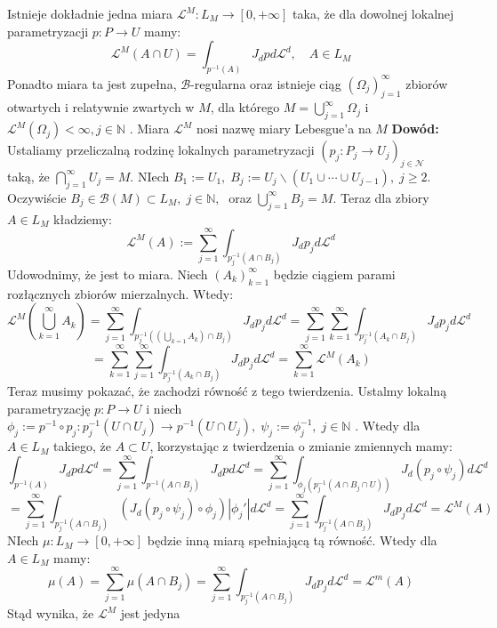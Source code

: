 \begin{tw}
	Istnieje dokładnie jedna miara $\mathcal{L}^M: L_M \rightarrow [0, +\infty]$ taka, że dla dowolnej lokalnej parametryzacji $p: P \rightarrow U$ mamy: $$
		\mathcal{L}^M(A \cap U) = \int_{p^{-1}(A)} J_dp d \mathcal{L}^d, \quad A \in L_M
	$$
	Ponadto miara ta jest zupełna, $\mathcal{B}$-regularna oraz istnieje ciąg $(\Omega_j)_{j=1}^{\infty}$ zbiorów otwartych i relatywnie zwartych w $M$, dla którego $M = \bigcup_{j=1}^{\infty} \Omega_j$ i $\mathcal{L}^M(\Omega_j) < \infty, j \in \mathbb{N}$ . Miara $\mathcal{L}^M$ nosi nazwę miary Lebesgue'a na $M$ 
	\newline
	\textbf{Dowód:}\newline
	Ustaliamy przeliczalną rodzinę lokalnych parametryzacji $(p_j: P_j \rightarrow U_j)_{j \in \mathcal{N}}$ taką, że $\bigcap_{j=1}^{\infty} U_j = M$. NIech $B_1:= U_1, \; B_j := U_j \backslash (U_1 \cup \cdots \cup U_{j-1}), \; j \geq 2$. Oczywiście $B_j \in \mathcal{B}(M) \subset L_M, \; j \in \mathbb{N},\;$ oraz $\bigcup_{j=1}^{\infty} B_j = M$. Teraz dla zbiory $A \in L_M$ kładziemy: $$
		\mathcal{L}^M(A) := \sum_{j=1}^{\infty} \int_{p_j^{-1}(A \cap B_j)} J_dp_j d\mathcal{L}^d
	$$
	Udowodnimy, że jest to miara. Niech $(A_k)_{k=1}^{\infty}$ będzie ciągiem parami rozłącznych zbiorów mierzalnych. Wtedy: 
	$$
		\mathcal{L}^M(\bigcup_{k=1}^{\infty} A_k) 
		= \sum^{\infty}_{j=1} \int_{p_j^{-1}((\bigcup_{k=1} A_k) \cap B_j)} J_dp_jd\mathcal{L}^d
		= \sum_{j=1}^{\infty} \sum_{k=1}^{\infty} \int_{p_j^{-1}(A_k \cap B_j)} J_dp_j d \mathcal{L}^d
	$$
	$$
		= \sum_{k=1}^{\infty} \sum_{j=1}^{\infty} \int_{p_j^{-1}(A_k \cap B_j)} J_dp_j d \mathcal{L}^d
		= \sum_{k=1}^{\infty} \mathcal{L}^M(A_k)
	$$
	Teraz musimy pokazać, że zachodzi równość z tego twierdzenia. Ustalmy lokalną parametryzację $p: P \rightarrow U$  i niech $\phi_j := p^{-1} \circ p_j:p^{-1}_j(U \cap U_j) \rightarrow p^{-1}(U \cap U_j), \; \psi_j := \phi_j^{-1}, \; j \in \mathbb{N}$ . Wtedy dla $A \in L_M$ takiego, że $A \subset U$, korzystając z twierdzenia o zmianie zmiennych mamy: $$
		\int_{p^{-1}(A)} J_dp d \mathcal{L}^d 
		= \sum_{j=1}^{\infty} \int_{p^{-1}(A \cap B_j)} J_dp d \mathcal{L}^d
		= \sum_{j=1}^{\infty} \int_{\phi_j(p_j^{-1}(A \cap B_j \cap U))} J_d(p_j \circ \psi_j) d \mathcal{L}^d
	$$
	$$
		= \sum_{j=1}^{\infty} \int_{p_j^{-1}(A \cap B_j)} (J_d(p_j \circ \psi_j) \circ \phi_j) |\phi_j'| d \mathcal{L}^d
		= \sum_{j=1}^{\infty} \int_{p_j^{-1}(A \cap B_j)} J_dp_j d \mathcal{L}^d = \mathcal{L}^M(A)
	$$
	NIech $\mu: L_M \rightarrow [0, +\infty]$ będzie inną miarą spełniającą tą równość. Wtedy dla $A \in L_M$ mamy: $$
		\mu(A) = \sum_{j=1}^{\infty} \mu(A \cap B_j) = \sum_{j=1}^{\infty} \int_{p_j^{-1}(A \cap B_j)} J_dp_j d \mathcal{L}^d = \mathcal{L}^m(A)
	$$
	Stąd wynika, że $\mathcal{L}^M$ jest jedyna
\end{tw}